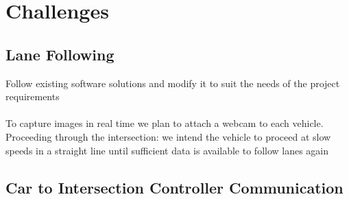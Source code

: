 \documentclass [11pt]{article}
\begin{document}
%
%
%
\pagebreak


\section{Challenges}

\subsection{Lane Following}

 Follow existing software solutions and modify it to suit the needs of the project requirements \\ \\
To capture images in real time we plan to attach a webcam to each vehicle.  \\
Proceeding through the intersection: we intend the vehicle to proceed at slow speeds in a straight line until sufficient data is available to follow lanes again


\subsection{Car to Intersection Controller Communication}
\end{document}
